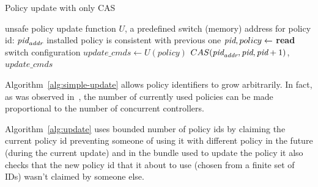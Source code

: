 \documentclass[conference]{sigcomm-alternate}
\newcommand{\hide}[1]{}
\newcommand{\addr}{\emph{addr}\xspace}
\newcommand{\pid}{\emph{pid}\xspace}
\newcommand{\ufunc}{U} %
\begin{document}
\begin{algorithm}[h]
    \caption{Policy update with only CAS}
    \label{alg:simple-update}
    \begin{algorithmic}[1]
    \Require unsafe policy update function $\ufunc$, a predefined switch (memory) address for policy id: $\pid_{\addr}$
    \Ensure installed policy is consistent with previous one
 		\Repeat
 			\State $\pid,policy\gets$ \textbf{read} switch configuration
 			\State $update\_cmds\gets \ufunc(policy)$
 			\startTxn
	 			\State $CAS(\pid_{\addr},\pid,\pid+1)$,
	 			\State $update\_cmds$ %
 			\endTxn
			\Return

    \end{algorithmic}
\end{algorithm}


Algorithm~\ref{alg:simple-update} allows policy identifiers to grow
arbitrarily. In fact, as was observed in~\cite{cpc}, the number of currently
used policies can be made proportional to the number of concurrent
controllers.


\hide{
It takes a set of rules $U$ (not yet a policy)and proceeds as follows: first, we seek to
 obtain a unique \emph{id}. FIXME: to be continued...
 \textbf{LS: I am not sure if I need to tell every step of the story or maybe it best to explain the main dif from the previous one similarly to what I just wrote next}.
}

Algorithm~\ref{alg:update} uses bounded number of policy ids by claiming the current policy id preventing someone of using it with different policy in the future (during the current update) and in the bundle used to update the policy it also checks that the new policy id that it about to use (chosen from a finite set of IDs) wasn't claimed by someone else.

\hide{
We compute our new suggested policy by applying the update requests on top of current policy, supporting any kind of requests and policies. Then we make a transaction (using the bundle feature) to atomically check that our policy id is not blocked by anyone else, to change the current policy id to ours (an action that would fail if the current policy id is no longer what we are counting of) and to actually configure our new policy.

If one of the actions in the transaction fails we try again. There is no progress guaranty for each controller but there is one for the whole system - at least one of the controller will succeed in fulfilling its update requirements.
}
\end{document}
